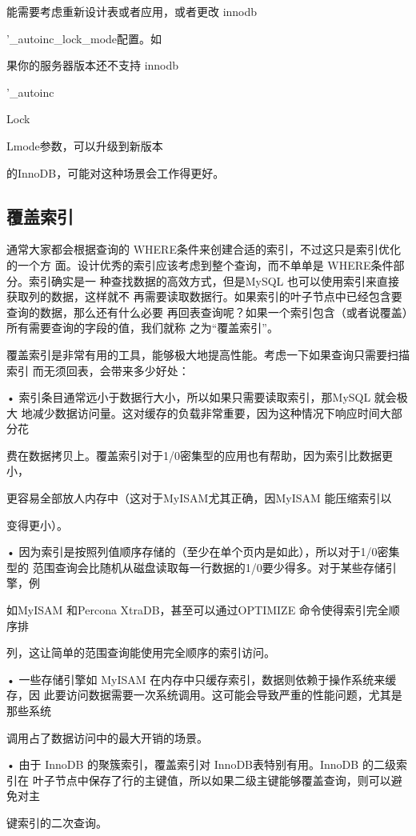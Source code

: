 能需要考虑重新设计表或者应用，或者更改 innodb

'\_autoinc\_lock\_mode配置。如

果你的服务器版本还不支持 innodb

'\_autoinc

Lock

Lmode参数，可以升级到新版本

的InnoDB，可能对这种场景会工作得更好。

\subsection{覆盖索引}
通常大家都会根据查询的 WHERE条件来创建合适的索引，不过这只是索引优化的一个方
面。设计优秀的索引应该考虑到整个查询，而不单单是 WHERE条件部分。索引确实是一
种查找数据的高效方式，但是MySQL 也可以使用索引来直接获取列的数据，这样就不
再需要读取数据行。如果索引的叶子节点中已经包含要查询的数据，那么还有什么必要
再回表查询呢？如果一个索引包含（或者说覆盖）所有需要查询的字段的值，我们就称
之为“覆盖索引”。

覆盖索引是非常有用的工具，能够极大地提高性能。考虑一下如果查询只需要扫描索引
而无须回表，会带来多少好处：

• 索引条目通常远小于数据行大小，所以如果只需要读取索引，那MySQL 就会极大
地减少数据访问量。这对缓存的负载非常重要，因为这种情况下响应时间大部分花

费在数据拷贝上。覆盖索引对于1/0密集型的应用也有帮助，因为索引比数据更小，

更容易全部放人内存中（这对于MyISAM尤其正确，因MyISAM 能压缩索引以

变得更小）。

• 因为索引是按照列值顺序存储的（至少在单个页内是如此），所以对于1/0密集型的
范围查询会比随机从磁盘读取每一行数据的1/0要少得多。对于某些存储引擎，例

如MyISAM 和Percona XtraDB，甚至可以通过OPTIMIZE 命令使得索引完全顺序排

列，这让简单的范围查询能使用完全顺序的索引访问。

• 一些存储引擎如 MyISAM 在内存中只缓存索引，数据则依赖于操作系统来缓存，因
此要访问数据需要一次系统调用。这可能会导致严重的性能问题，尤其是那些系统

调用占了数据访问中的最大开销的场景。

• 由于 InnoDB 的聚簇索引，覆盖索引对 InnoDB表特别有用。InnoDB 的二级索引在
叶子节点中保存了行的主键值，所以如果二级主键能够覆盖查询，则可以避免对主

键索引的二次查询。

